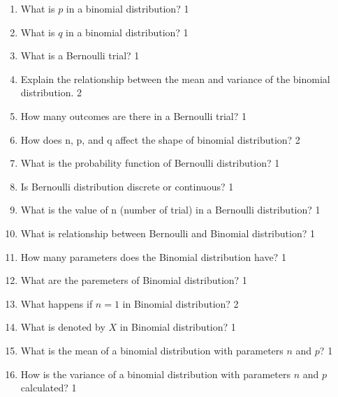 \documentclass[a4paper,oneside, margin=1.4in]{book}
\begin{document}
 \begin{enumerate}
 
 \item What is $p$ in a binomial distribution? \hfill 1
 
 \item What is $q$ in a binomial distribution? \hfill 1
 
 \item What is a Bernoulli trial?  \hfill 1
 
 \item Explain the relationship between the mean and variance of the binomial distribution. \hfill 2
 
 \item How many outcomes are there in a Bernoulli trial?  \hfill 1
 
 \item How does n, p, and q affect the shape of binomial distribution? \hfill 2
 
 \item What is the probability function of Bernoulli distribution? \hfill 1
 
 \item Is Bernoulli distribution discrete or continuous? \hfill 1
 
 \item What is the value of n (number of trial) in a Bernoulli distribution? \hfill 1
 
 \item What is relationship between Bernoulli and Binomial distribution? \hfill 1
 
 \item How many parameters does the Binomial distribution have? \hfill 1
  
  \item What are the paremeters of Binomial distribution? \hfill 1
  
  \item What happens if $n=1$ in Binomial distribution? \hfill 2
  
  \item What is denoted by $X$ in Binomial distribution? \hfill 1
  
 \item What is the mean of a binomial distribution with parameters \( n \) and \( p \)? \hfill 1

\item How is the variance of a binomial distribution with parameters \( n \) and \( p \) calculated? \hfill 1


\end{enumerate}
\end{document}
